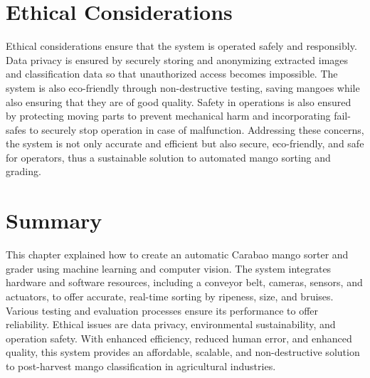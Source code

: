 \section{Ethical Considerations}
Ethical considerations ensure that the system is operated safely and responsibly. Data privacy is ensured by securely storing and anonymizing extracted images and classification data so that unauthorized access becomes impossible. The system is also eco-friendly through non-destructive testing, saving mangoes while also ensuring that they are of good quality. Safety in operations is also ensured by protecting moving parts to prevent mechanical harm and incorporating fail-safes to securely stop operation in case of malfunction. Addressing these concerns, the system is not only accurate and efficient but also secure, eco-friendly, and safe for operators, thus a sustainable solution to automated mango sorting and grading.

\section{Summary}
This chapter explained how to create an automatic Carabao mango sorter and grader using machine learning and computer vision. The system integrates hardware and software resources, including a conveyor belt, cameras, sensors, and actuators, to offer accurate, real-time sorting by ripeness, size, and bruises. Various testing and evaluation processes ensure its performance to offer reliability. Ethical issues are data privacy, environmental sustainability, and operation safety. With enhanced efficiency, reduced human error, and enhanced quality, this system provides an affordable, scalable, and non-destructive solution to post-harvest mango classification in agricultural industries.
